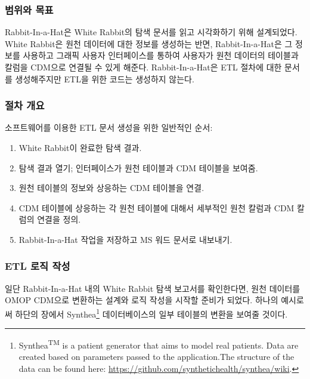 \documentclass[10.5pt]{book}
\providecommand{\tightlist}{%
  \setlength{\itemsep}{0pt}\setlength{\parskip}{0pt}}
\let\rmarkdownfootnote\footnote%
\def\footnote{\protect\rmarkdownfootnote}
\theoremstyle{definition}
\theoremstyle{definition}
\theoremstyle{definition}
\theoremstyle{remark}
\begin{document}
\subsubsection*{범위와 목표}\label{--1}

Rabbit-In-a-Hat은 White Rabbit의 탐색 문서를 읽고 시각화하기 위해
설계되었다. White Rabbit은 원천 데이터에 대한 정보를 생성하는 반면,
Rabbit-In-a-Hat은 그 정보를 사용하고 그래픽 사용자 인터페이스를 통하여
사용자가 원천 데이터의 테이블과 칼럼을 CDM으로 연결될 수 있게 해준다.
Rabbit-In-a-Hat은 ETL 절차에 대한 문서를 생성해주지만 ETL을 위한 코드는
생성하지 않는다.

\subsubsection*{절차 개요}\label{--1}

소프트웨어를 이용한 ETL 문서 생성을 위한 일반적인 순서:

\begin{enumerate}
\def\labelenumi{\arabic{enumi}.}
\tightlist
\item
  White Rabbit이 완료한 탐색 결과.
\item
  탐색 결과 열기; 인터페이스가 원천 테이블과 CDM 테이블을 보여줌.
\item
  원천 테이블의 정보와 상응하는 CDM 테이블을 연결.
\item
  CDM 테이블에 상응하는 각 원천 테이블에 대해서 세부적인 원천 칼럼과 CDM
  칼럼의 연결을 정의.
\item
  Rabbit-In-a-Hat 작업을 저장하고 MS 워드 문서로 내보내기.
\end{enumerate}

\subsubsection*{ETL 로직 작성}\label{etl--}

일단 Rabbit-In-a-Hat 내의 White Rabbit 탐색 보고서를 확인한다면, 원천
데이터를 OMOP CDM으로 변환하는 설계와 로직 작성을 시작할 준비가 되었다.
하나의 예시로써 하단의 장에서 Synthea\footnote{Synthea\textsuperscript{TM}
  is a patient generator that aims to model real patients. Data are
  created based on parameters passed to the application.The structure of
  the data can be found here:
  \url{https://github.com/synthetichealth/synthea/wiki}.} 데이터베이스의
일부 테이블의 변환을 보여줄 것이다.
\end{document}
